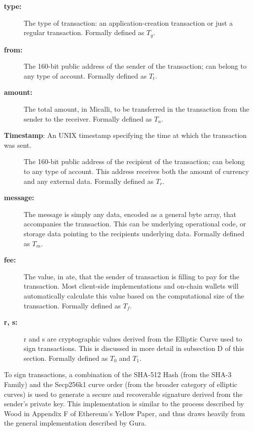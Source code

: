 \documentclass[conference]{IEEEtran}
\begin{document}
\begin{description}
\item[\textbf{type:}] The type of transaction: an application-creation transaction or just a regular transaction. Formally defined as $T_y$.
\item[\textbf{from:}] The 160-bit public address of the sender of the transaction; can belong to any type of account. Formally defined as $T_t$.
\item[\textbf{amount:}]\hspace{10}  The total amount, in Micalli, to be transferred in the transaction from the sender to the receiver. Formally defined as $T_a$.
\item[\textbf{Timestamp}: An UNIX timestamp specifying the time at which the transaction was sent.
\item[\textbf{receiver:}]\hspace{10} The 160-bit public address of the recipient of the transaction; can belong to any type of account. This address receives both the amount of currency and any external data. Formally defined as $T_r$.

\item[\textbf{message:}]\hspace{10}  The message is simply any data, encoded as a general byte array, that accompanies the transaction. This can be underlying operational code, or storage data pointing to the recipients underlying data. Formally defined as $T_m$.

\item[\textbf{fee:}] The value, in ate, that the sender of transaction is filling to pay for the transaction. Most client-side implementations and on-chain wallets will automatically calculate this value based on the computational size of the transaction. Formally defined as $T_f$.

\item[\textbf{r, s:}] r and s are cryptographic values derived from the Elliptic Curve used to sign transactions. This is discussed in more detail in subsection D of this section. Formally defined as $T_0$ and $T_1$.



\end{description}

To sign transactions, a combination of the SHA-512 Hash (from the SHA-3 Family) and the Secp256k1 curve order (from the broader category of elliptic curves) is used to generate a secure and recoverable signature derived from the sender's private key. This implementation is similar to the process described by Wood in Appendix F of Ethereum's Yellow Paper, and thus draws heavily from the general implementation described by Gura. \cite{guraSECP256k1}
\end{document}
